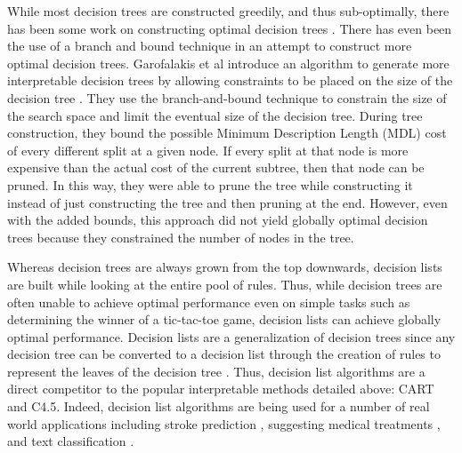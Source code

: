 \documentclass[]{article}
\theoremstyle{definition}
\begin{document}
While most decision trees are constructed greedily, and thus sub-optimally, there has been some work on constructing optimal decision trees \cite{Moret82}.
There has even been the use of a branch and bound technique in an attempt to construct more optimal decision trees.
Garofalakis et al introduce an algorithm to generate more interpretable decision trees by allowing constraints to be placed on the size of the decision tree \cite{GarofalakisHyRaSh00}.
They use the branch-and-bound technique to constrain the size of the search space and limit the eventual size of the decision tree.
During tree construction, they bound the possible Minimum Description Length (MDL) cost of every different split at a given node.
If every split at that node is more expensive than the actual cost of the current subtree, then that node can be pruned.
In this way, they were able to prune the tree while constructing it instead of just constructing the tree and then pruning at the end.
However, even with the added bounds, this approach did not yield globally optimal decision trees because they constrained the number of nodes in the tree.

Whereas decision trees are always grown from the top downwards, decision lists are built while looking at the entire pool of rules.
Thus, while decision trees are often unable to achieve optimal performance even on simple tasks such as determining the winner of a tic-tac-toe game, decision lists can achieve globally optimal performance.
Decision lists are a generalization of decision trees since any decision tree can be converted to a decision list through the creation of rules to represent the leaves of the decision tree \cite{Rivest87}.
Thus, decision list algorithms are a direct competitor to the popular interpretable methods detailed above: CART and C4.5.
Indeed, decision list algorithms are being used for a number of real world applications including stroke prediction \cite{LethamRuMcMa15}, suggesting medical treatments \cite{ZhangLaTsDa2015}, and text classification \cite{LiYa02}.
\end{document}
